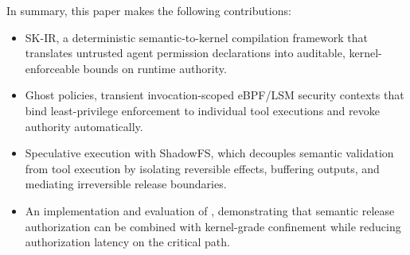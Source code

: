 
In summary, this paper makes the following contributions:
\begin{itemize}
\item SK-IR, a deterministic semantic-to-kernel compilation framework that
translates untrusted agent permission declarations into auditable,
kernel-enforceable bounds on runtime authority.

\item Ghost policies, transient invocation-scoped eBPF/LSM security contexts
that bind least-privilege enforcement to individual tool executions and revoke
authority automatically.

\item Speculative execution with ShadowFS, which decouples semantic validation
from tool execution by isolating reversible effects, buffering outputs, and
mediating irreversible release boundaries.

\item An implementation and evaluation of \SystemName, demonstrating that
semantic release authorization can be combined with kernel-grade confinement
while reducing authorization latency on the critical path.
\end{itemize}
